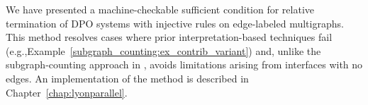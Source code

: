 We have presented a machine-checkable sufficient condition for relative termination of DPO systems with injective rules on edge-labeled multigraphs.  
This method resolves cases where prior interpretation-based techniques \cite{zantema2014termination,bruggink2014termination,bruggink2015proving,endrullis2024generalized_arxiv_v2,
overbeek2024termination_lmcs} fail (e.g.,Example~\ref{subgraph_counting:ex_contrib_variant}) and, unlike the subgraph-counting approach in \cite{overbeek2024termination_lmcs}, avoids limitations arising from interfaces with no edges.
An implementation of the method is described in Chapter~\ref{chap:lyonparallel}.
